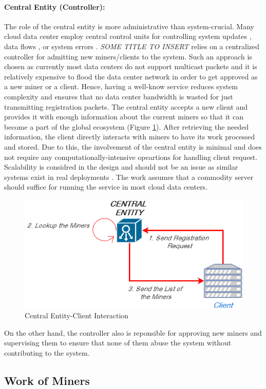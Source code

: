 \documentclass{article}
\newcommand{\projTitle}{SOME TITLE TO INSERT}
\begin{document}
\paragraph{Central Entity (Controller):} The role of the central entity is more administrative than system-crucial. Many cloud data center employ central control units for controlling system updates \cite{microsoft-autopilot}, data flows \cite{google_jupiter}, or system errors \cite{microsoft_netpoirot}. \textit{\projTitle} relies on a centralized controller for admitting new miners/clients to the system. Such an approach is chosen as currently most data centers do not support multicast packets and it is relatively expensive to flood the data center network in order to get approved as a new miner or a client. Hence, having a well-know service reduces system complexity and ensures that no data center bandwidth is wasted for just transmitting registration packets. The central entity accepts a new client and provides it with enough information about the current miners so that it can become a part of the global ecosystem (Figure \ref{fig:central_entity_client_reg}). After retrieving the needed information, the client directly interacts with miners to have its work processed and stored. Due to this, the involvement of the central entity is minimal and does not require any computationally-intensive opeartions for handling client request. Scalability is considred in the design and should not be an issue as similar systems exist in real deployments \cite{hadoop_example}. The work assumes that a commodity server should suffice for running the service in most cloud data centers. 
\par

\begin{figure}[h]
  \includegraphics[width=0.5\linewidth]{central_entity_client_reg.png}
  \caption{Central Entity-Client Interaction}
  \label{fig:central_entity_client_reg}
\end{figure}


\noindent \newline On the other hand, the controller also is reponsible for approving new miners and supervising them to ensure that none of them abuse the system without contributing to the system.  



\subsection{Work of Miners}


     
\newpage


\end{document}
